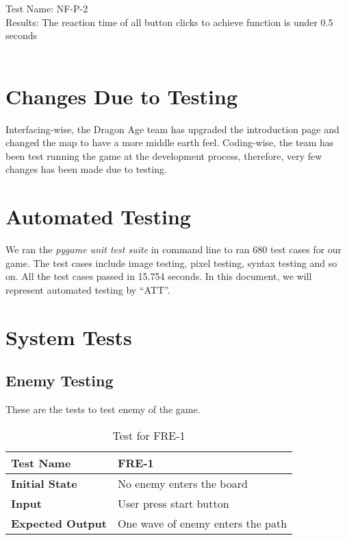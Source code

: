 \documentclass[12,english]{article}
\begin{document}
	Test Name: NF-P-2 \\
	
	Results: The reaction time of all button clicks to achieve function is under 0.5 seconds\\ \\

\section{Changes Due to Testing}
Interfacing-wise, the Dragon Age team has upgraded the introduction page and changed the map to have a more middle earth feel. Coding-wise, the team has been test running the game at the development process, therefore, very few changes has been made due to testing.

\section{Automated Testing}
We ran the \textit{pygame unit test suite} in command line to ran 680 test cases for our game. The test cases include image testing, pixel testing, syntax testing and so on. All the test cases passed in 15.754 seconds. In this document, we will represent automated testing by ``ATT''.

\section{System Tests}
    \subsection{Enemy Testing}
    These are the tests to test enemy of the game.
        \begin{table}[h!]
        	\begin{tabular}[r]{|l|l|}
        	    \hline
        		\textbf{Test Name} & FRE-1 \\ 
        		\hline
        		\textbf{Initial State} & No enemy enters the board\\ 
        		\hline
        		\textbf{Input} & User press start button \\ 
        		\hline 
        		\textbf{Expected Output} & One wave of enemy enters the path\\ 
        		\hline
        	\end{tabular}
        	\caption{Test for FRE-1}
        	\label{Table}
        \end{table}
        
\end{document}
